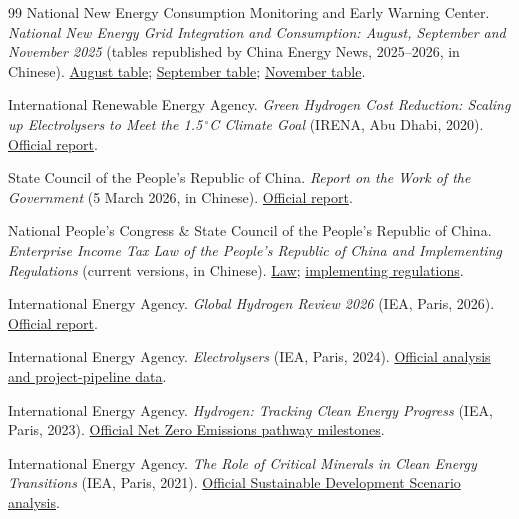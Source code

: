\documentclass[11pt,a4paper]{article}
\begin{document}
\begin{thebibliography}{99}
National New Energy Consumption Monitoring and Early Warning Center. \emph{National New Energy Grid Integration and Consumption: August, September and November 2025} (tables republished by China Energy News, 2025--2026, in Chinese). \href{https://epaper.ceic.com/pc/attachment/202510/13/26e6af76-e1b7-40fb-b126-bc59f391e51c.pdf}{August table}; \href{https://epaper.ceic.com/pc/attachment/202511/07/6063762d-43ea-41fc-a37d-5f5549f62a5d.pdf}{September table}; \href{https://epaper.ceic.com/pc/attachment/202601/12/bf2a9f58-b724-435d-8c46-447e3ebbdc3d.pdf}{November table}.

International Renewable Energy Agency. \emph{Green Hydrogen Cost Reduction: Scaling up Electrolysers to Meet the 1.5\,$^\circ$C Climate Goal} (IRENA, Abu Dhabi, 2020). \href{https://www.irena.org/-/media/Files/IRENA/Agency/Publication/2020/Dec/IRENA_Green_hydrogen_cost_2020.pdf}{Official report}.

State Council of the People's Republic of China. \emph{Report on the Work of the Government} (5 March 2026, in Chinese). \href{https://www.npc.gov.cn/c2/c30834/202603/t20260316_453264.html}{Official report}.

National People's Congress \& State Council of the People's Republic of China. \emph{Enterprise Income Tax Law of the People's Republic of China and Implementing Regulations} (current versions, in Chinese). \href{https://flk.npc.gov.cn/detail?id=ff8080816f135f46016f2106acd11784}{Law}; \href{https://policy.mofcom.gov.cn/claw/clawContent.shtml?id=102338}{implementing regulations}.

International Energy Agency. \emph{Global Hydrogen Review 2026} (IEA, Paris, 2026). \href{https://www.iea.org/reports/global-hydrogen-review-2026}{Official report}.

International Energy Agency. \emph{Electrolysers} (IEA, Paris, 2024). \href{https://www.iea.org/energy-system/hydrogen/electrolysers}{Official analysis and project-pipeline data}.

International Energy Agency. \emph{Hydrogen: Tracking Clean Energy Progress} (IEA, Paris, 2023). \href{https://www.iea.org/reports/hydrogen-2156}{Official Net Zero Emissions pathway milestones}.

International Energy Agency. \emph{The Role of Critical Minerals in Clean Energy Transitions} (IEA, Paris, 2021). \href{https://www.iea.org/reports/the-role-of-critical-minerals-in-clean-energy-transitions/mineral-requirements-for-clean-energy-transitions}{Official Sustainable Development Scenario analysis}.


\end{thebibliography}
\end{document}

